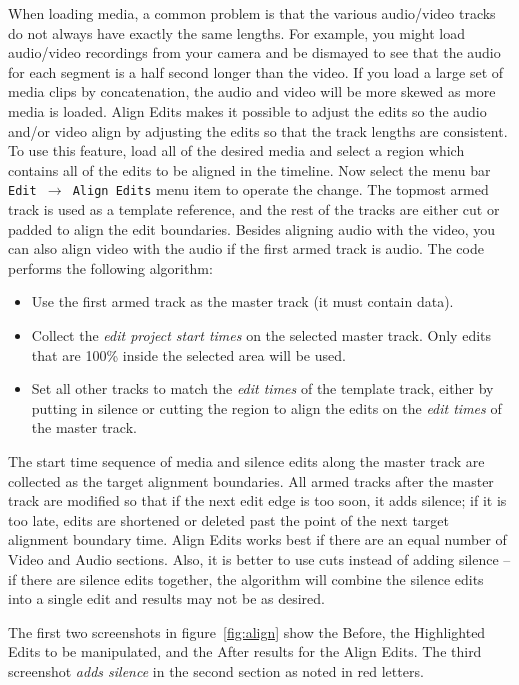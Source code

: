 When loading media, a common problem is that the various audio/video
tracks do not always have exactly the same lengths. For example, you
might load audio/video recordings from your camera and be dismayed
to see that the audio for each segment is a half second longer than
the video. If you load a large set of media clips by concatenation,
the audio and video will be more skewed as more media is
loaded. Align Edits makes it possible to adjust the edits so the
audio and/or video align by adjusting
the edits so that the track lengths are consistent. To use this
feature, load all of the desired media and select a region which
contains all of the edits to be aligned in the timeline. Now select
the menu bar \texttt{Edit $\rightarrow$ Align Edits} menu item to
operate the change. The topmost armed track is used as a template
reference, and the rest of the tracks are either cut or padded to
align the edit boundaries.  Besides aligning audio with the video,
you can also align video with the audio if the first armed track is
audio. The code performs the following algorithm:

\begin{itemize}
\item Use the first armed track as the master track (it must
  contain data).
\item Collect the \textit{edit project start times} on the
  selected master track. Only edits that are 100\% inside the selected
  area will be used.
\item Set all other tracks to match the \textit{edit times} of
  the template track, either by putting in silence or cutting the
  region to align the edits on the \textit{edit times} of the master
  track.
\end{itemize}

The start time sequence of media and silence edits
along the master track are collected as the target alignment
boundaries. All armed tracks after the master track are modified so
that if the next edit edge is too soon, it adds silence; if it is
too late, edits are shortened or deleted past the point of the next
target alignment boundary time.  Align Edits works best if there are
an equal number of Video and Audio sections.  Also, it is better to
use cuts instead of adding silence -- if there are silence edits
together, the algorithm will combine the silence edits into a single
edit and results may not be as desired.

The first two screenshots in figure~\ref{fig:align} show the Before,
the Highlighted Edits to be manipulated, and the After results for
the Align Edits. The third screenshot \textit{adds silence} in the
second section as noted in red letters.

